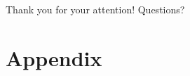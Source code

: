\documentclass{beamer}
\begin{document}
\begin{frame}
\centering
\vfill
Thank you for your attention!\vfill
\vfill
\pause
Questions?
\vfill
\end{frame}

\begin{frame}
\printbibliography
\end{frame}

\section*{Appendix}
\end{document}
